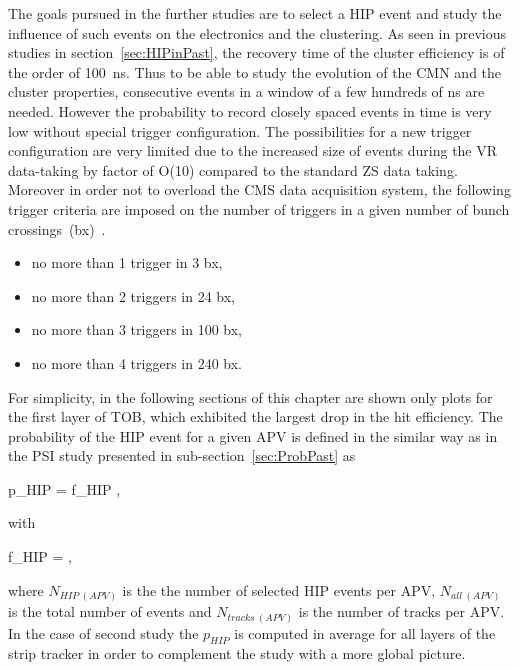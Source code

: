 The goals pursued in the further studies are to select a HIP event and study the influence of such events on the electronics and the clustering. As seen in previous studies in section~\ref{sec:HIPinPast}, the recovery time of the cluster efficiency is of the order of 100~ns. Thus to be able to study the evolution of the CMN and the cluster properties, consecutive events in a window of a few hundreds of ns are needed. However the probability to record closely spaced events in time is very low without special trigger configuration. The possibilities for a new trigger configuration are very limited due to the increased size of events during the VR data-taking by factor of O(10) compared to the standard ZS data taking. Moreover in order not to overload the CMS data acquisition system, the following trigger criteria are imposed on the number of triggers in a given number of bunch crossings~(bx)~\cite{website:VRtrigger}.

\begin{itemize}
\item{no more than 1 trigger in 3 bx,}
\item{no more than 2 triggers in 24 bx,}
\item{no more than 3 triggers in 100 bx,}
\item{no more than 4 triggers in 240 bx.}
\end{itemize}


For simplicity, in the following sections of this chapter are shown only plots for the first layer of TOB, which exhibited the largest drop in the hit efficiency. The probability of the HIP event for a given APV is defined in the similar way as in the PSI study presented in sub-section~\ref{sec:ProbPast} as


{
p_{HIP} = f_{HIP} ,
}

with


{
f_{HIP} = ,
}


where $N_{HIP~(APV)}$ is the the number of selected HIP events per APV, $N_{all~(APV)}$ is the total number of events and $N_{tracks~(APV)}$ is the number of tracks per APV. In the case of second study the $p_{HIP}$ is computed in average for all layers of the strip tracker in order to complement the study with a more global picture.

